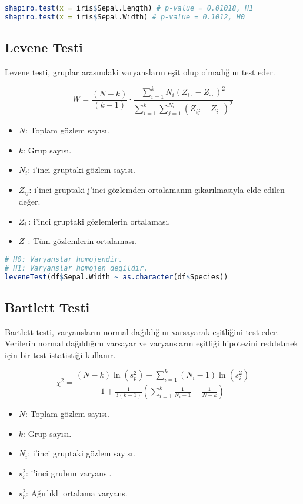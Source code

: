 \begin{lstlisting}[language=R]
shapiro.test(x = iris$Sepal.Length) # p-value = 0.01018, H1
shapiro.test(x = iris$Sepal.Width) # p-value = 0.1012, H0
\end{lstlisting}

\newpage

\subsection{Levene Testi}
Levene testi, gruplar arasındaki varyansların eşit olup olmadığını test eder.

\[
W = \frac{(N - k)}{(k - 1)} \cdot \frac{\sum_{i=1}^{k} N_i (Z_{i \cdot} - Z_{\cdot \cdot})^2}{\sum_{i=1}^{k} \sum_{j=1}^{N_i} (Z_{ij} - Z_{i \cdot})^2}
\]

\begin{itemize}
	\item $N$: Toplam gözlem sayısı.
	\item $k$: Grup sayısı.
	\item $N_i$: i'inci gruptaki gözlem sayısı.
	\item $Z_{ij}$: i'inci gruptaki j'inci gözlemden ortalamanın çıkarılmasıyla elde edilen değer.
	\item $Z_{i.}$: i'inci gruptaki gözlemlerin ortalaması.
	\item $Z_{..}$: Tüm gözlemlerin ortalaması.
\end{itemize}

\begin{lstlisting}[language=R]
# H0: Varyanslar homojendir.
# H1: Varyanslar homojen degildir.
leveneTest(df$Sepal.Width ~ as.character(df$Species))
\end{lstlisting}

\newpage

\subsection{Bartlett Testi}
Bartlett testi, varyansların normal dağıldığını varsayarak eşitliğini test eder. Verilerin normal dağıldığını varsayar ve varyansların eşitliği hipotezini reddetmek için bir test istatistiği kullanır.

\[
\chi^2 = \frac{(N - k) \ln(s_p^2) - \sum_{i=1}^{k} (N_i - 1) \ln(s_i^2)}{1 + \frac{1}{3(k-1)} \left( \sum_{i=1}^{k} \frac{1}{N_i - 1} - \frac{1}{N - k} \right)}
\]

\begin{itemize}
	\item $N$: Toplam gözlem sayısı.
	\item $k$: Grup sayısı.
	\item $N_i$: i'inci gruptaki gözlem sayısı.
	\item $s_i^2$: i'inci grubun varyansı.
	\item $s_p^2$: Ağırlıklı ortalama varyans.
\end{itemize}


